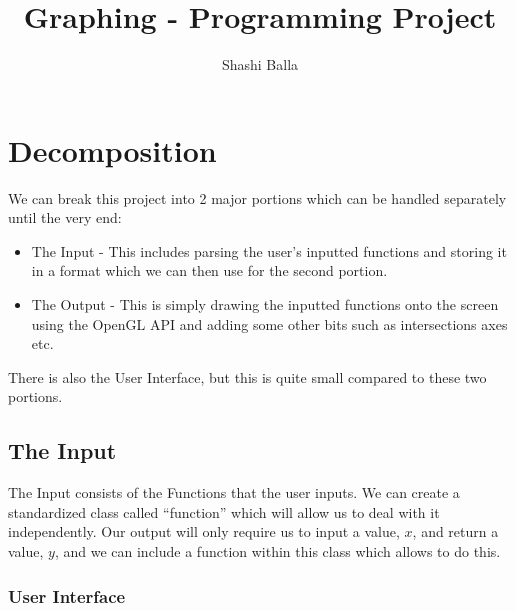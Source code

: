 \documentclass{article}
\author{Shashi Balla}
\title{Graphing - Programming Project}
\begin{document}
\maketitle

\tableofcontents
\newpage
\section{Decomposition}
We can break this project into 2 major portions which can be handled separately until the very end:
\begin{itemize}
	\item The Input - This includes parsing the user's inputted functions and storing it in a format which we can then use for the second portion.
	\item The Output - This is simply drawing the inputted functions onto the screen using the OpenGL API and adding some other bits such as intersections axes etc.
\end{itemize}
There is also the User Interface, but this is quite small compared to these two portions.
\subsection{The Input}
The Input consists of the Functions that the user inputs. We can create a standardized class called ``function''  which will allow us to deal with it independently. Our output will only require us to input a value, $x$, and return a value, $y$, and we can include a function within this class which allows to do this.
\subsubsection{User Interface}
\end{document}
